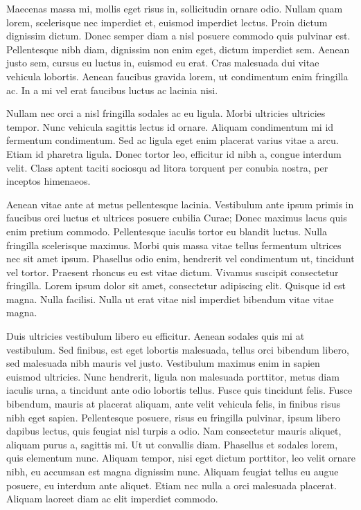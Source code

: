 \documentclass[a4paper,10pt,twoside]{article} %
\begin{document}
Maecenas massa mi, mollis eget risus in, sollicitudin ornare odio.
Nullam quam lorem, scelerisque nec imperdiet et, euismod imperdiet lectus.
Proin dictum dignissim dictum.
Donec semper diam a nisl posuere commodo quis pulvinar est.
Pellentesque nibh diam, dignissim non enim eget, dictum imperdiet sem.
Aenean justo sem, cursus eu luctus in, euismod eu erat.
Cras malesuada dui vitae vehicula lobortis.
Aenean faucibus gravida lorem, ut condimentum enim fringilla ac.
In a mi vel erat faucibus luctus ac lacinia nisi.

Nullam nec orci a nisl fringilla sodales ac eu ligula.
Morbi ultricies ultricies tempor.
Nunc vehicula sagittis lectus id ornare.
Aliquam condimentum mi id fermentum condimentum.
Sed ac ligula eget enim placerat varius vitae a arcu.
Etiam id pharetra ligula.
Donec tortor leo, efficitur id nibh a, congue interdum velit.
Class aptent taciti sociosqu ad litora torquent per conubia nostra, per inceptos himenaeos.

Aenean vitae ante at metus pellentesque lacinia.
Vestibulum ante ipsum primis in faucibus orci luctus et ultrices posuere cubilia Curae; Donec maximus lacus quis enim pretium commodo.
Pellentesque iaculis tortor eu blandit luctus.
Nulla fringilla scelerisque maximus.
Morbi quis massa vitae tellus fermentum ultrices nec sit amet ipsum.
Phasellus odio enim, hendrerit vel condimentum ut, tincidunt vel tortor.
Praesent rhoncus eu est vitae dictum.
Vivamus suscipit consectetur fringilla.
Lorem ipsum dolor sit amet, consectetur adipiscing elit.
Quisque id est magna.
Nulla facilisi.
Nulla ut erat vitae nisl imperdiet bibendum vitae vitae magna.

Duis ultricies vestibulum libero eu efficitur.
Aenean sodales quis mi at vestibulum.
Sed finibus, est eget lobortis malesuada, tellus orci bibendum libero, sed malesuada nibh mauris vel justo.
Vestibulum maximus enim in sapien euismod ultricies.
Nunc hendrerit, ligula non malesuada porttitor, metus diam iaculis urna, a tincidunt ante odio lobortis tellus.
Fusce quis tincidunt felis.
Fusce bibendum, mauris at placerat aliquam, ante velit vehicula felis, in finibus risus nibh eget sapien.
Pellentesque posuere, risus eu fringilla pulvinar, ipsum libero dapibus lectus, quis feugiat nisl turpis a odio.
Nam consectetur mauris aliquet, aliquam purus a, sagittis mi.
Ut ut convallis diam.
Phasellus et sodales lorem, quis elementum nunc.
Aliquam tempor, nisi eget dictum porttitor, leo velit ornare nibh, eu accumsan est magna dignissim nunc.
Aliquam feugiat tellus eu augue posuere, eu interdum ante aliquet.
Etiam nec nulla a orci malesuada placerat.
Aliquam laoreet diam ac elit imperdiet commodo.
\end{document}
